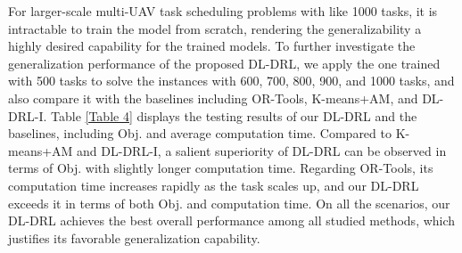 \documentclass[lettersize,journal]{IEEEtran}
\begin{document}
	For larger-scale multi-UAV task scheduling problems with like 1000 tasks, it is intractable to train the model from scratch, rendering the generalizability a highly desired capability for the trained models. To further investigate the generalization performance of the proposed DL-DRL, we apply the one trained with 500 tasks to solve the instances with 600, 700, 800, 900, and 1000 tasks, and also compare it with the baselines including OR-Tools, K-means+AM, and DL-DRL-I. Table \ref{Table 4} displays the testing results of our DL-DRL and the baselines, including Obj. and average computation time. Compared to K-means+AM and DL-DRL-I, a salient superiority of DL-DRL can be observed in terms of Obj. with slightly longer computation time. Regarding OR-Tools, its computation time increases rapidly as the task scales up, and our DL-DRL exceeds it in terms of both Obj. and computation time. On all the scenarios, our DL-DRL achieves the best overall performance among all studied methods, which justifies its favorable generalization capability.
	
\end{document}
